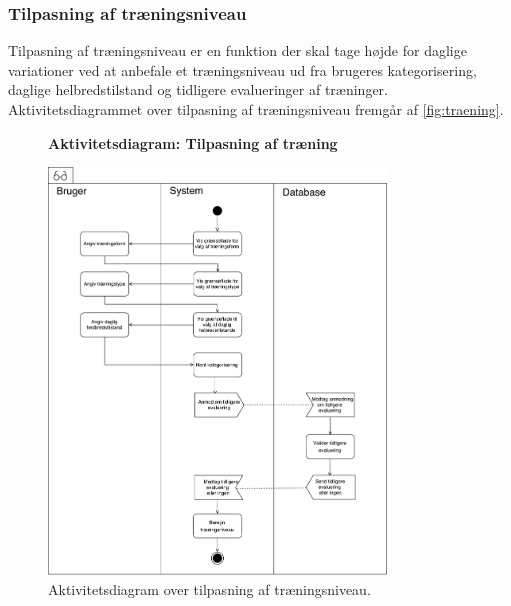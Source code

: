 \subsubsection*{Tilpasning af træningsniveau} \label{sec:traeningsniveau}



Tilpasning af træningsniveau er en funktion der skal tage højde for daglige variationer ved at anbefale et træningsniveau ud fra brugeres kategorisering, daglige helbredstilstand og tidligere evalueringer af træninger.  
Aktivitetsdiagrammet over tilpasning af træningsniveau fremgår af \autoref{fig:traening}.
 
\begin{figure} [H]
\centering
\textbf{Aktivitetsdiagram: Tilpasning af træning}\par\medskip
\includegraphics[width=0.8\textwidth]{figures/aktivitetsdiagram/Tilpasningaftraeningsniveau}
\caption{Aktivitetsdiagram over tilpasning af træningsniveau.}
\label{fig:traeningsniveau}
\end{figure}

